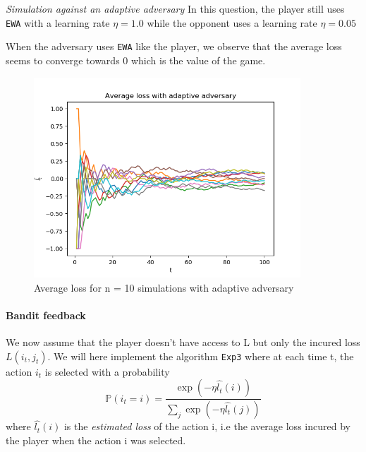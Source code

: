  \textit{Simulation against an adaptive adversary}
In this question, the player still uses \texttt{EWA} with a learning rate $\eta = 1.0$ while the opponent uses a learning rate $\eta = 0.05$

When the adversary uses \texttt{EWA} like the player, we observe that the average loss seems to converge towards 0 which is the value of the game.

\begin{figure}
	\includegraphics[width=10cm]{images/question4a}
	\caption{Average loss for n = 10 simulations with adaptive adversary}
	\label{fig:question4a}
\end{figure}

\begin{figure}[h!]
	\qquad
	\label{fig:question4b}
\end{figure}

\paragraph*{Bandit feedback} We now assume that the player doesn't have access to L but only the incured loss $L(i_t, j_t)$. We will here implement the algorithm \texttt{Exp3} where at each time t, the action $i_t$ is selected with a probability
\begin{equation}
\mathbb{P}(i_t = i) = \frac{\exp{(- \eta \hat{l_t}(i))}}{\sum_j \exp{(- \eta \hat{l_t}(j))}}
\label{exp3equation}
\end{equation}
where $\hat{l_t}(i)$ is the \textit{estimated loss} of the action i, i.e the average loss incured by the player when the action i was selected.

